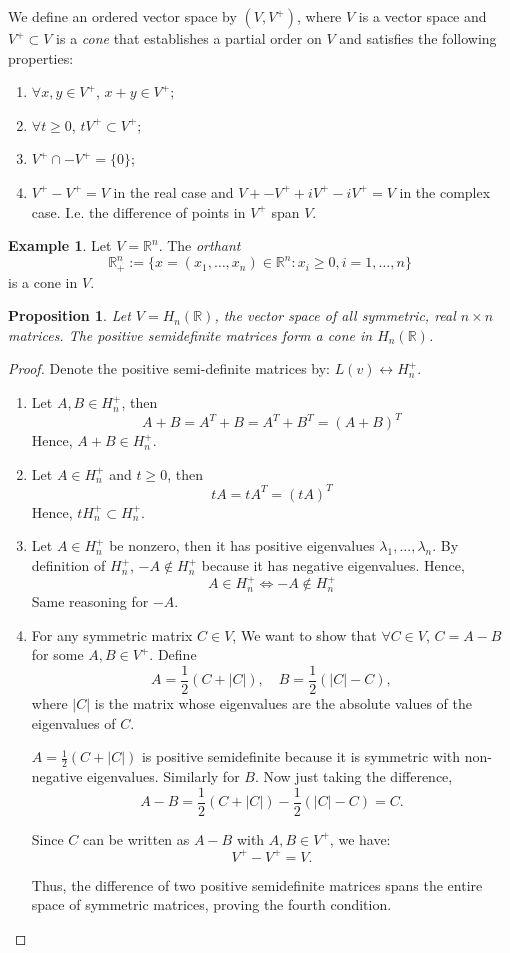 \documentclass[11pt]{amsart}
\newtheorem{prop}[thm]{Proposition}
\theoremstyle{definition}
\newtheorem{example}[thm]{Example}
\def\bb{\mathbb}
\begin{document}
We define an ordered vector space by \((V, V^+)\), where \(V\) is a vector space and \(V^+ \subset V\) is a \emph{cone} that establishes a partial order on \(V\) and satisfies the following properties:
\begin{enumerate}
    \item \(\forall x, y \in V^+\), \(x + y \in V^+\);
    \item \(\forall t \geq 0\), \(tV^+ \subset V^+\);
    \item \(V^+ \cap -V^+ = \{0\}\);
    \item $V^+ - V^+ = V$ in the real case and $V+ - V^+ + iV^+ - iV^+ = V$ in the complex case. I.e. the difference of points in $V^+$ span $V$.
\end{enumerate}

\begin{example}
    Let $V = \bb R^n$. The \emph{orthant} 
    \[\bb R_+^n := \{x = (x_1,\dotsc,x_n)\in \bb R^n : x_i\geq 0, i=1,\dotsc,n\}\]
    is a cone in $V$.
\end{example}

\begin{prop}
    Let $V = H_n(\bb R)$, the vector space of all symmetric, real $n\times n$ matrices. The \emph{positive semidefinite matrices} form a cone in $H_n(\bb R)$.
\end{prop}

\begin{proof} Denote the positive semi-definite matrices by: $L(v) \leftrightarrow H^+_{n}$.
\begin{enumerate}
    \item Let \(A, B \in H^+_{n}\), then \[A + B = A^T + B = A^T + B^T = (A + B)^T\] Hence, \(A + B \in H^+_{n}\).
    \item Let \(A \in H^+_{n}\) and \(t \geq 0\), then \[tA = tA^T = (tA)^T\] Hence, \(tH^+_{n} \subset H^+_{n}\).
    \item Let \(A \in H^+_{n}\) be nonzero, then it has positive eigenvalues \(\lambda_1, ..., \lambda_n\). By definition of \(H^+_{n}\), \(-A \notin H^+_{n}\) because it has negative eigenvalues. Hence, \[A \in H^+_{n} \iff -A \notin H^+_{n}\] Same reasoning for \(-A\).
    \item For any symmetric matrix \( C \in V \), We want to show that \( \forall C \in V \), \( C = A - B \) for some \( A, B \in V^+ \). Define
   \[
   A = \frac{1}{2} (C + |C|), \quad B = \frac{1}{2} (|C| - C),
   \]
   where \( |C| \) is the matrix whose eigenvalues are the absolute values of the eigenvalues of \( C \). 

\( A = \frac{1}{2}(C + |C|) \) is positive semidefinite because it is symmetric with non-negative eigenvalues. Similarly for $B$. Now just taking the difference,
   \[
   A - B = \frac{1}{2}(C + |C|) - \frac{1}{2}(|C| - C) = C.
   \]

Since \( C \) can be written as \( A - B \) with \( A, B \in V^+ \), we have:
   \[
   V^+ - V^+ = V.
   \]

Thus, the difference of two positive semidefinite matrices spans the entire space of symmetric matrices, proving the fourth condition.

\end{enumerate}
\end{proof}
\end{document}
